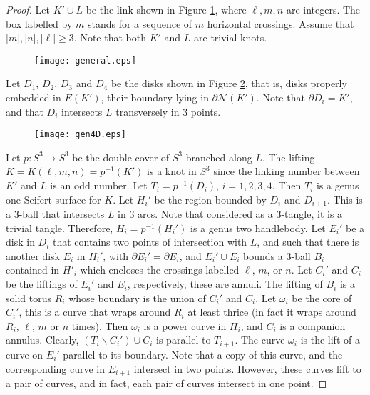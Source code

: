 \documentclass[12pt]{amsart}
\begin{document}
\begin{proof} Let $K'\cup L$ be the link shown in Figure \ref{generalizacion}, where $\ell,m,n$ are integers. The  box labelled by $m$ stands for a sequence of $m$ horizontal crossings. Assume that $\vert m \vert, \vert n \vert, \vert \ell \vert \geq 3$. Note that both $K'$ and $L$ are trivial knots. 

\begin{figure}
\begin{center}
\texttt{[image: general.eps]}    
\end{center}
\caption{}
\label{generalizacion}

\end{figure}

Let $D_1$, $D_2$, $D_3$ and $D_4$ be the disks shown in Figure \ref{discos}, that is, disks properly embedded in $E(K')$, their boundary lying in $\partial \mathcal{N}(K')$. Note that $\partial D_i =K'$, and that $D_i$ intersects $L$ transversely in 3 points.

\begin{figure}
\begin{center}
\texttt{[image: gen4D.eps]}  \end{center}

\caption{}
\label{discos}

\end{figure}

Let $p: S^3 \rightarrow S^3$ be the double cover of $S^3$ branched along $L$. The lifting $K=K(\ell,m,n)=p^{-1}(K')$  is a knot in $S^3$ since the linking number between $K'$ and $L$ is an odd number. Let $T_i=p^{-1}(D_i)$, $i=1,2,3,4$. Then $T_i$ is a genus one Seifert surface for $K$. Let $H_i'$ be the region bounded by $D_i$ and $D_{i+1}$. This is a 3-ball that intersects $L$ in 3 arcs. Note that considered as a 3-tangle, it is a trivial tangle. Therefore,
$H_i=p^{-1}(H_i')$ is a genus two handlebody. Let $E_i'$ be a disk in $D_i$ that contains two points of intersection with $L$, and such that there is another 
disk $E_i$ in $H_i'$, with $\partial E_i' = \partial E_i$, and $E_i' \cup E_i$ bounds a 3-ball $B_i$ contained in $H'_i$ which encloses the 
crossings labelled $\ell$, $m$, or $n$. Let $C_i'$ and $C_i$ be the liftings of $E_i'$ and $E_i$, respectively, these are annuli. The lifting of $B_i$ is a solid torus $R_i$ whose boundary is the union of $C_i'$ and $C_i$. Let $\omega_i$ be the core of $C_i'$, this is a curve that wraps around $R_i$ at least thrice (in fact it wraps around $R_i$, $\ell$, $m$ or $n$ times). Then $\omega_i$ is a power curve in $H_i$, and $C_i$ is a companion annulus. Clearly,
$(T_i\backslash C_i')\cup C_i$ is parallel to $T_{i+1}$. The curve $\omega_i$ is the lift of a curve on $E_i'$ parallel to its boundary. Note that a copy of this curve, and the corresponding curve in $E_{i+1}$ intersect in two points. However, these curves lift to a pair of curves, and in fact, each pair of curves intersect in one point. \end{proof}
\end{document}
